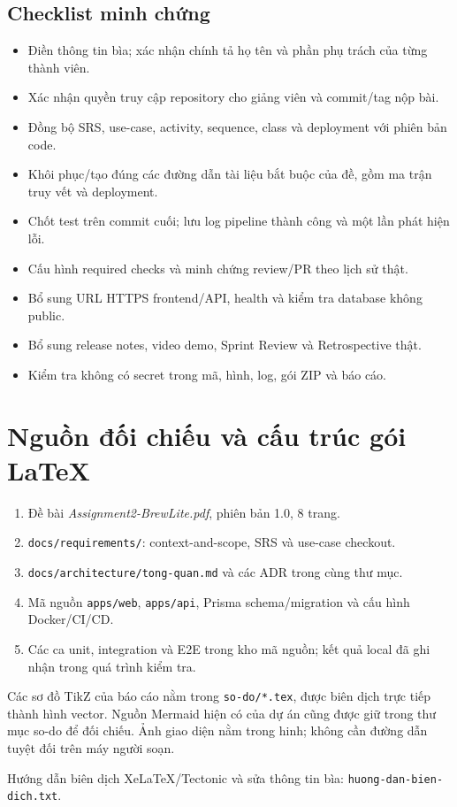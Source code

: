 \documentclass[12pt,a4paper]{article}
\newcommand{\tep}[1]{\nolinkurl{#1}}
\begin{document}
\subsection{Checklist minh chứng}
\begin{itemize}[label=$\square$]
\item Điền thông tin bìa; xác nhận chính tả họ tên và phần phụ trách của từng thành viên.
\item Xác nhận quyền truy cập repository cho giảng viên và commit/tag nộp bài.
\item Đồng bộ SRS, use-case, activity, sequence, class và deployment với phiên bản code.
\item Khôi phục/tạo đúng các đường dẫn tài liệu bắt buộc của đề, gồm ma trận truy vết và deployment.
\item Chốt test trên commit cuối; lưu log pipeline thành công và một lần phát hiện lỗi.
\item Cấu hình required checks và minh chứng review/PR theo lịch sử thật.
\item Bổ sung URL HTTPS frontend/API, health và kiểm tra database không public.
\item Bổ sung release notes, video demo, Sprint Review và Retrospective thật.
\item Kiểm tra không có secret trong mã, hình, log, gói ZIP và báo cáo.
\end{itemize}

\section{Nguồn đối chiếu và cấu trúc gói LaTeX}
\begin{enumerate}
\item Đề bài \textit{Assignment2-BrewLite.pdf}, phiên bản 1.0, 8 trang.
\item \tep{docs/requirements/}: context-and-scope, SRS và use-case checkout.
\item \tep{docs/architecture/tong-quan.md} và các ADR trong cùng thư mục.
\item Mã nguồn \tep{apps/web}, \tep{apps/api}, Prisma schema/migration và cấu hình Docker/CI/CD.
\item Các ca unit, integration và E2E trong kho mã nguồn; kết quả local đã ghi nhận trong quá trình kiểm tra.
\end{enumerate}
Các sơ đồ TikZ của báo cáo nằm trong \tep{so-do/*.tex}, được biên dịch trực tiếp thành hình vector. Nguồn Mermaid hiện có của dự án cũng được giữ trong thư mục so-do để đối chiếu. Ảnh giao diện nằm trong hinh; không cần đường dẫn tuyệt đối trên máy người soạn.

Hướng dẫn biên dịch XeLaTeX/Tectonic và sửa thông tin bìa: \tep{huong-dan-bien-dich.txt}.
\end{document}
